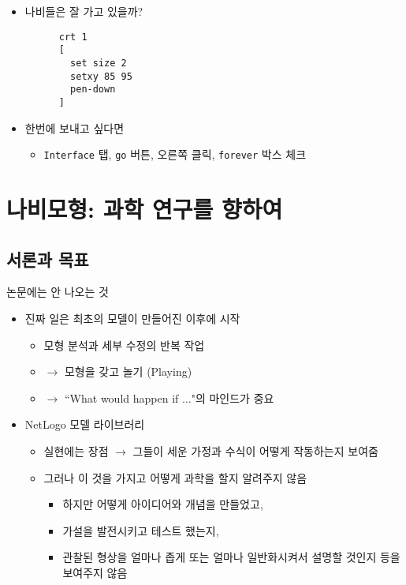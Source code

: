 \documentclass[hyperref={unicode}]{beamer}
\begin{document}
\begin{frame}[fragile]
\begin{itemize}
\item 나비들은 잘 가고 있을까?
	\begin{verbatim}
	  crt 1
	  [
	    set size 2
	    setxy 85 95
	    pen-down
	  ]
	\end{verbatim}
\item 한번에 보내고 싶다면
	\begin{itemize}
	\item \verb|Interface| 탭, \verb|go| 버튼, 오른쪽 클릭, \verb|forever| 박스 체크
	\end{itemize}	
\end{itemize}	
\end{frame}

\section{나비모형: 과학 연구를 향하여}
\subsection*{서론과 목표}
\begin{frame}{논문에는 안 나오는 것}
\begin{itemize}
\item 진짜 일은 최초의 모델이 만들어진 이후에 시작
	\begin{itemize}
	\item 모형 분석과 세부 수정의 반복 작업
	\item $\rightarrow$ 모형을 갖고 놀기 (Playing) 
	\item $\rightarrow$ ``What would happen if $\ldots$"의 마인드가 중요
	\end{itemize}
\item NetLogo 모델 라이브러리
	\begin{itemize}
	\item 실현에는 장점 $\rightarrow$ 그들이 세운 가정과 수식이 어떻게 작동하는지 보여줌
	\item 그러나 이 것을 가지고 어떻게 과학을 할지 알려주지 않음
		\begin{itemize}
		\item 하지만 어떻게 아이디어와 개념을 만들었고, 
		\item 가설을 발전시키고 테스트 했는지, 
		\item 관찰된 형상을 얼마나 좁게 또는 얼마나 일반화시켜서 설명할 것인지 등을 보여주지 않음
		\end{itemize}
	\end{itemize}
\end{itemize}	
\end{frame}
\end{document}
